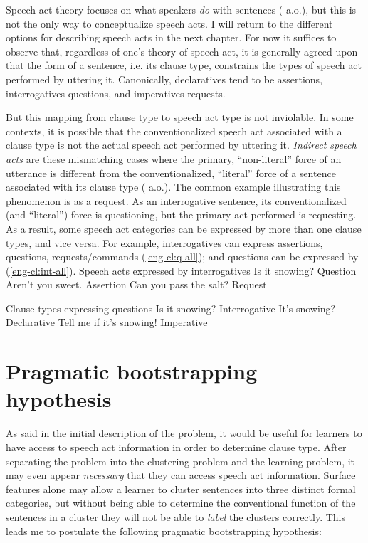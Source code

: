 Speech act theory focuses on what speakers \emph{do} with sentences (\cite{austin1975things, searle1969} a.o.), but this is not the only way to conceptualize speech acts. I will return to the different options for describing speech acts in the next chapter. For now it suffices to observe that, regardless of one's theory of speech act, it is generally agreed upon that the form of a sentence, i.e. its clause type, constrains the types of speech act performed by uttering it. Canonically, declaratives tend to be assertions, interrogatives questions, and imperatives requests. 


But this mapping from clause type to speech act type is not inviolable. In some contexts, it is possible that the conventionalized speech act associated with a clause type is not the actual speech act performed by uttering it. \emph{Indirect speech acts} are these mismatching cases where the primary, ``non-literal'' force of an utterance is different from the conventionalized, ``literal'' force of a sentence associated with its clause type (\citealt{searle1975tax, searle1976class, bachharnish1979, levinson1983, searlevanderveken1985, portner2018, starr2014, murraystarr2020} a.o.). The common example illustrating this phenomenon is  as a request. As an interrogative sentence, its conventionalized (and ``literal'') force is questioning, but the primary act performed is requesting. As a result, some speech act categories can be expressed by more than one clause types, and vice versa. For example, interrogatives can express assertions, questions, requests/commands (\ref{eng-cl:q-all}); and questions can be expressed by \diis{} (\ref{eng-cl:int-all}).
Speech acts expressed by interrogatives 
\bxl Is it snowing? \hfill Question
\ex Aren't you sweet. \hfill Assertion
\ex Can you pass the salt? \hfill Request
\exl
\eex

Clause types expressing questions
\bxl
Is it snowing? \hfill Interrogative
\ex It's snowing? \hfill Declarative
\ex Tell me if it's snowing! \hfill Imperative
\exl
\eex


\section{Pragmatic bootstrapping hypothesis}

As said in the initial description of the problem, it would be useful for learners to have access to speech act information in order to determine clause type. After separating the problem into the clustering problem and the learning problem, it may even appear \emph{necessary} that they can access speech act information. Surface features alone may allow a learner to cluster sentences into three distinct formal categories, but without being able to determine the conventional function of the sentences in a cluster they will not be able to \emph{label} the clusters correctly. This leads me to postulate the following pragmatic bootstrapping hypothesis:

